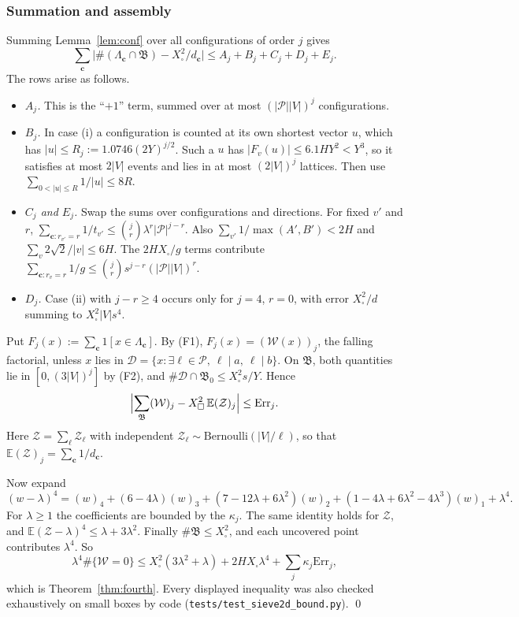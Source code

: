 \documentclass[11pt]{amsart}
\theoremstyle{definition}
\newcommand{\Xb}{X_{\square}}
\begin{document}
\subsubsection{Summation and assembly}
Summing Lemma~\ref{lem:conf} over all configurations of order $j$ gives
\[
  \sum_{\mathbf c}\bigl|\#(\Lambda_{\mathbf c}\cap\mathfrak B)-\Xb^2/d_{\mathbf c}\bigr|\le
  A_j+B_j+C_j+D_j+E_j.
\]
The rows arise as follows.
\begin{itemize}
\item \emph{$A_j$.} This is the ``$+1$'' term, summed over at most $(|\mathcal P||V|)^j$
  configurations.
\item \emph{$B_j$.} In case (i) a configuration is counted at its own shortest vector $u$, which
  has $|u|\le R_j:=1.0746(2Y)^{j/2}$. Such a $u$ has $|F_v(u)|\le6.1HY^2<Y^3$, so it satisfies at
  most $2|V|$ events and lies in at most $(2|V|)^j$ lattices. Then use
  $\sum_{0<|u|\le R}1/|u|\le8R$.
\item \emph{$C_j$ and $E_j$.} Swap the sums over configurations and directions. For fixed $v'$
  and $r$, $\sum_{\mathbf c:r_{v'}=r}1/t_{v'}\le\binom jr\lambda^r|\mathcal P|^{j-r}$. Also
  $\sum_{v'}1/\max(A',B')<2H$ and $\sum_v2\sqrt2/|v|\le6H$. The $2H\Xb/g$ terms contribute
  $\sum_{\mathbf c:r_v=r}1/g\le\binom jrs^{j-r}(|\mathcal P||V|)^r$.
\item \emph{$D_j$.} Case (ii) with $j-r\ge4$ occurs only for $j=4$, $r=0$, with error
  $\Xb^2/d$ summing to $\Xb^2|V|s^4$.
\end{itemize}

Put $F_j(x):=\sum_{\mathbf c}1[x\in\Lambda_{\mathbf c}]$. By (F1),
$F_j(x)=(\mathcal W(x))_j$, the falling factorial, unless $x$ lies in
$\mathcal D=\{x:\exists\ell\in\mathcal P,\ \ell\mid a,\ \ell\mid b\}$. On $\mathfrak B$, both
quantities lie in $[0,(3|V|)^j]$ by (F2), and $\#\mathcal D\cap\mathfrak B_0\le\Xb^2s/Y$. Hence
\[
  \Bigl|\sum_{\mathfrak B}(\mathcal W)_j-\Xb^2\,\mathbb E(\mathcal Z)_j\Bigr|\le\mathrm{Err}_j.
\]
Here $\mathcal Z=\sum_\ell\mathcal Z_\ell$ with independent
$\mathcal Z_\ell\sim\mathrm{Bernoulli}(|V|/\ell)$, so that
$\mathbb E(\mathcal Z)_j=\sum_{\mathbf c}1/d_{\mathbf c}$.

Now expand
\[
(w-\lambda)^4=(w)_4+(6-4\lambda)(w)_3+(7-12\lambda+6\lambda^2)(w)_2+(1-4\lambda+6\lambda^2-4\lambda^3)(w)_1+\lambda^4 .
\]
For $\lambda\ge1$ the coefficients are bounded by the $\kappa_j$. The same identity holds for
$\mathcal Z$, and $\mathbb E(\mathcal Z-\lambda)^4\le\lambda+3\lambda^2$. Finally
$\#\mathfrak B\le\Xb^2$, and each uncovered point contributes $\lambda^4$. So
\[
  \lambda^4\#\{\mathcal W=0\}\le\Xb^2(3\lambda^2+\lambda)+2H\Xb\lambda^4+\sum_j\kappa_j\mathrm{Err}_j,
\]
which is Theorem~\ref{thm:fourth}. Every displayed inequality was also checked exhaustively on
small boxes by code (\texttt{tests/test\_sieve2d\_bound.py}). \qed
\end{document}

